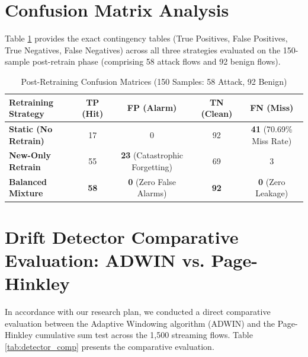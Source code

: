 \documentclass[12pt,a4paper,oneside]{report}
\begin{document}
\section{Confusion Matrix Analysis}
Table \ref{tab:confusion_matrices} provides the exact contingency tables (True Positives, False Positives, True Negatives, False Negatives) across all three strategies evaluated on the 150-sample post-retrain phase (comprising 58 attack flows and 92 benign flows).

\begin{table}[H]
\caption{Post-Retraining Confusion Matrices (150 Samples: 58 Attack, 92 Benign)}
\centering
\begin{tabularx}{\columnwidth}{X c c c c}
\toprule
\textbf{Retraining Strategy} & \textbf{TP (Hit)} & \textbf{FP (Alarm)} & \textbf{TN (Clean)} & \textbf{FN (Miss)} \\
\midrule
\textbf{Static (No Retrain)} & 17 & 0 & 92 & \textbf{41} (70.69\% Miss Rate) \\
\textbf{New-Only Retrain}    & 55 & \textbf{23} (Catastrophic Forgetting) & 69 & 3 \\
\textbf{Balanced Mixture}   & \textbf{58} & \textbf{0} (Zero False Alarms) & \textbf{92} & \textbf{0} (Zero Leakage) \\
\bottomrule
\end{tabularx}
\label{tab:confusion_matrices}
\end{table}

\section{Drift Detector Comparative Evaluation: ADWIN vs. Page-Hinkley}
In accordance with our research plan, we conducted a direct comparative evaluation between the Adaptive Windowing algorithm (ADWIN) and the Page-Hinkley cumulative sum test across the 1,500 streaming flows. Table \ref{tab:detector_comp} presents the comparative evaluation.
\end{document}
